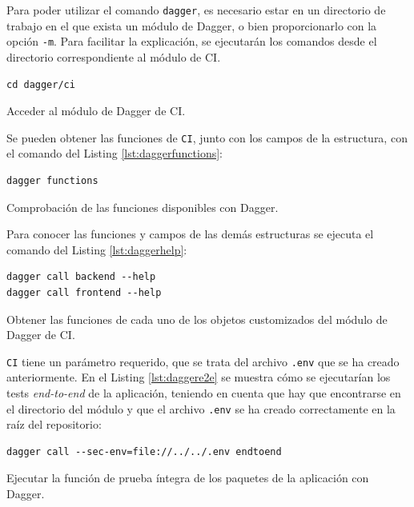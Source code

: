 \begin{enumerate}
    Para poder utilizar el comando \texttt{dagger}, es necesario estar en un directorio de trabajo en el que exista un módulo de Dagger, o bien proporcionarlo con la opción \texttt{-m}. Para facilitar la explicación, se ejecutarán los comandos desde el directorio correspondiente al módulo de CI.

\begin{listing}[!ht]
  \begin{verbatim}
cd dagger/ci
\end{verbatim}
\caption{Acceder al módulo de Dagger de CI.}
\end{listing}

Se pueden obtener las funciones de \texttt{CI}, junto con los campos de la estructura, con el comando del Listing \ref{lst:daggerfunctions}:

\begin{listing}[!ht]
  \begin{verbatim}
dagger functions
\end{verbatim}
\caption{Comprobación de las funciones disponibles con Dagger.}
\label{lst:daggerfunctions}
\end{listing}

  Para conocer las funciones y campos de las demás estructuras se ejecuta el comando del Listing \ref{lst:daggerhelp}:

\begin{listing}[!ht]
  \begin{verbatim}
dagger call backend --help
dagger call frontend --help
\end{verbatim}
\caption{Obtener las funciones de cada uno de los objetos customizados del módulo de Dagger de CI.}
\label{lst:daggerhelp}
\end{listing}

  \texttt{CI} tiene un parámetro requerido, que se trata del archivo \texttt{.env} que se ha creado anteriormente. En el Listing \ref{lst:daggere2e} se muestra cómo se ejecutarían los tests \textit{end-to-end} de la aplicación, teniendo en cuenta que hay que encontrarse en el directorio del módulo y que el archivo \texttt{.env} se ha creado correctamente en la raíz del repositorio:

\begin{listing}[!ht]
  \begin{verbatim}
dagger call --sec-env=file://../../.env endtoend
\end{verbatim}
\caption{Ejecutar la función de prueba íntegra de los paquetes de la aplicación con Dagger.}
\label{lst:daggere2e}
\end{listing}


\end{enumerate}
